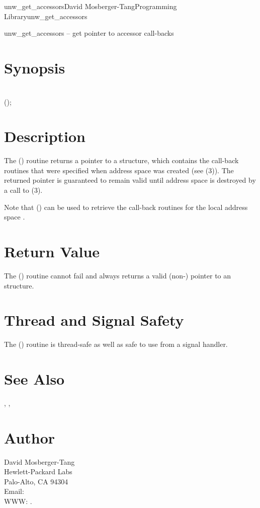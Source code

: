 \documentclass{article}
\begin{document}
\begin{Name}{3}{unw\_get\_accessors}{David Mosberger-Tang}{Programming Library}{unw\_get\_accessors}

  unw\_get\_accessors -- get pointer to accessor call-backs
\end{Name}

\section{Synopsis}

\\

();\\

\section{Description}

The () routine returns a pointer to a
 structure, which contains the call-back
routines that were specified when address space  was created
(see (3)).  The returned pointer is
guaranteed to remain valid until address space  is destroyed
by a call to (3).

Note that () can be used to retrieve the
call-back routines for the local address space
.

\section{Return Value}

The () routine cannot fail and always
returns a valid (non-) pointer to an
 structure.

\section{Thread and Signal Safety}

The () routine is thread-safe as well as
safe to use from a signal handler.

\section{See Also}

,
,

\section{Author}

\noindent
David Mosberger-Tang\\
Hewlett-Packard Labs\\
Palo-Alto, CA 94304\\
Email: \\
WWW: .
\LatexManEnd
\end{document}
